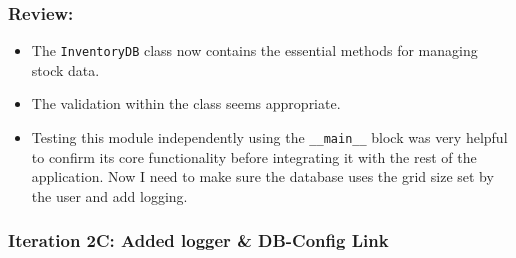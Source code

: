 \subsubsection{Review:}
\begin{itemize}
	\item The \verb|InventoryDB| class now contains the essential methods for managing stock data.
	\item The validation within the class seems appropriate.
	\item Testing this module independently using the \verb|__main__| block was very helpful to confirm its core functionality before integrating it with the rest of the application. Now I need to make sure the database uses the grid size set by the user and add logging.
\end{itemize}

\newpage

\subsubsection{Iteration 2C: Added logger \& DB-Config Link}

